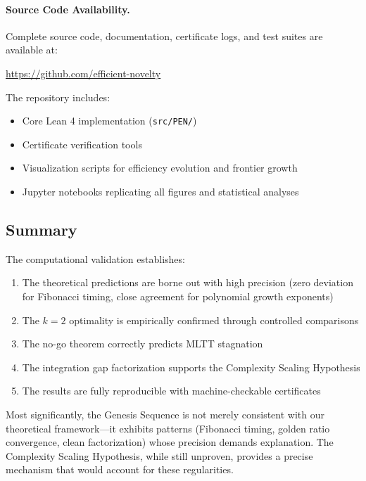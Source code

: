 \documentclass[11pt]{article}
\theoremstyle{definition}
\theoremstyle{remark}
\begin{document}
\paragraph{Source Code Availability.}

Complete source code, documentation, certificate logs, and test suites are available at:
\begin{center}
\url{https://github.com/efficient-novelty}
\end{center}

The repository includes:
\begin{itemize}
\item Core Lean 4 implementation (\texttt{src/PEN/})
\item Certificate verification tools
\item Visualization scripts for efficiency evolution and frontier growth
\item Jupyter notebooks replicating all figures and statistical analyses
\end{itemize}

\subsection{Summary}

The computational validation establishes:

\begin{enumerate}
\item The theoretical predictions are borne out with high precision (zero deviation for Fibonacci timing, close agreement for polynomial growth exponents)

\item The $k=2$ optimality is empirically confirmed through controlled comparisons

\item The no-go theorem correctly predicts MLTT stagnation

\item The integration gap factorization supports the Complexity Scaling Hypothesis

\item The results are fully reproducible with machine-checkable certificates
\end{enumerate}

Most significantly, the Genesis Sequence is not merely consistent with our theoretical framework---it exhibits patterns (Fibonacci timing, golden ratio convergence, clean factorization) whose precision demands explanation. The Complexity Scaling Hypothesis, while still unproven, provides a precise mechanism that would account for these regularities.
\end{document}
